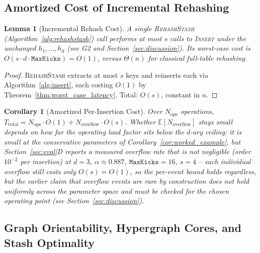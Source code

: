 \documentclass[conference]{IEEEtran}
\let\oldtextsc\textsc
\renewcommand{\textsc}[1]{\textup{\oldtextsc{#1}}}
\newtheorem{lemma}{Lemma}
\newtheorem{corollary}{Corollary}
\begin{document}
	\subsection{Amortized Cost of Incremental Rehashing}
	
	\begin{lemma}[Incremental Rehash Cost]
		\label{lem:rehash_cost}
		A single \textsc{RehashStash} (Algorithm~\ref{alg:rehashstash})
		call performs at most $s$ calls to \textsc{Insert} under the
		\emph{unchanged} $h_1,\dots,h_d$ (see G2 and
		Section~\ref{sec:discussion}). Its worst-case cost is
		$O(s\cdot d\cdot\mathtt{MaxKicks})=O(1)$, versus $\Theta(n)$ for
		classical full-table rehashing.
	\end{lemma}
	\begin{proof}
		\textsc{RehashStash} extracts at most $s$ keys and reinserts each
		via Algorithm~\ref{alg:insert}, each costing $O(1)$ by
		Theorem~\ref{thm:worst_case_latency}. Total: $O(s)$, constant in
		$n$.
	\end{proof}
	
	\begin{corollary}[Amortized Per-Insertion Cost]
		\label{cor:amortized}
		Over $N_{\text{ops}}$ operations,
		$T_{\text{total}} = N_{\text{ops}}\cdot O(1) + N_{\text{overflow}}\cdot O(s)$.
		Whether $\mathbb{E}[N_{\text{overflow}}]$ stays small depends on how
		far the operating load factor sits below the $d$-ary ceiling: it is
		small at the conservative parameters of
		Corollary~\ref{cor:worked_example}, but Section~\ref{sec:eval}D
		reports a measured overflow rate that is \emph{not} negligible
		(order $10^{-2}$ per insertion) at $d=3$, $\alpha\approx0.887$,
		$\mathtt{MaxKicks}=16$, $s=4$ -- each individual overflow still costs
		only $O(s)=O(1)$, so the per-event bound holds regardless, but the
		earlier claim that overflow events are rare \emph{by construction}
		does not hold uniformly across the parameter space and must be
		checked for the chosen operating point (see
		Section~\ref{sec:discussion}).
	\end{corollary}
	
	\subsection{Graph Orientability, Hypergraph Cores, and Stash Optimality}
	
\end{document}
